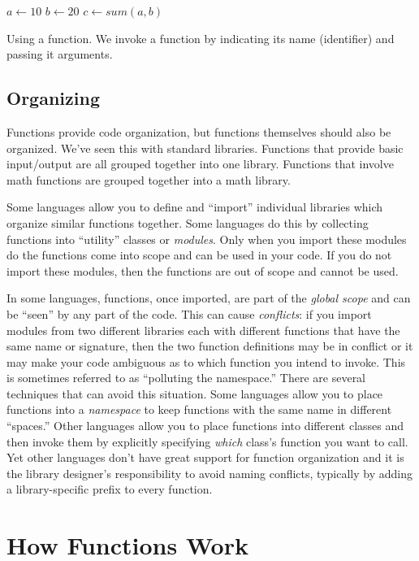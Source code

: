 \begin{algorithm}[H]
$a \leftarrow 10$ \;
$b \leftarrow 20$ \;
$c \leftarrow sum(a, b)$ \;
\caption[Using a function]{Using a function.  We invoke a function by 
indicating its name (identifier) and passing it arguments.}
\label{algorithm:functionCall}
\end{algorithm}

\subsection{Organizing}   

Functions provide code organization, but functions themselves should also
be organized.  We've seen this with standard libraries.  Functions that provide
basic input/output are all grouped together into one library.  
Functions that involve math functions are grouped together into a math library.

Some languages allow you to define and ``import'' individual libraries 
which organize similar functions together.  Some languages do this by 
collecting functions into ``utility'' classes or \emph{modules}.  Only when
you import these modules do the functions come into scope and can be
used in your code.  If you do not import these modules, then the functions
are out of scope and cannot be used.  

In some languages, functions, once imported, are part of the \emph{global
scope} and can be ``seen'' by any part of the code.  This can cause
\emph{conflicts}: if you import modules from two different libraries each
with different functions that have the same name or signature, then 
the two function definitions may be in conflict or it may make your
code ambiguous as to which function you intend to invoke.  This is
sometimes referred to as ``polluting the namespace.''  There are
several techniques that can avoid this situation.  Some languages allow
you to place functions into a \emph{namespace} to keep functions with
the same name in different ``spaces.''  Other languages allow you to 
place functions into different classes and then invoke them by explicitly
specifying \emph{which} class's function you want to call.  Yet other
languages don't have great support for function organization and it is
the library designer's responsibility to avoid naming conflicts, typically
by adding a library-specific prefix to every function.

\section{How Functions Work}
\label{section:howFunctionsWork}

